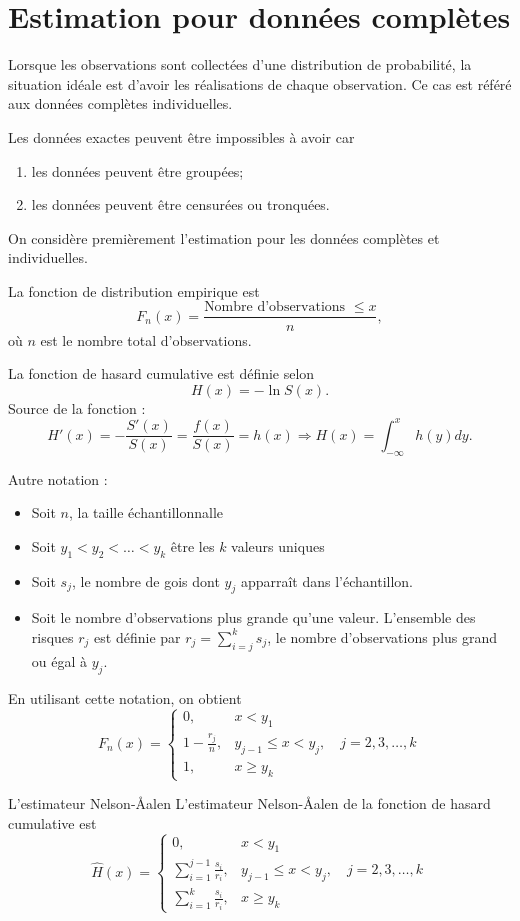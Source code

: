 \chapter{Estimation pour données complètes}

Lorsque les observations sont collectées d'une distribution de probabilité, la situation idéale est d'avoir les réalisations de chaque observation. Ce cas est référé aux données complètes individuelles. 

Les données exactes peuvent être impossibles à avoir car
\begin{enumerate}
	\item les données peuvent être groupées;
	\item les données peuvent être censurées ou tronquées. 
\end{enumerate}

On considère premièrement l'estimation pour les données complètes et individuelles. 

\begin{definition}{}{}
	La fonction de distribution empirique est 
	$$F_n(x) = \frac{\text{Nombre d'observations }\leq x}{n},$$
	où $n$ est le nombre total d'observations. 
\end{definition}

\begin{definition}{}{}
	La fonction de hasard cumulative est définie selon 
	$$H(x) = -\ln S(x).$$
	\tcblower
	Source de la fonction : 
	$$H'(x) = -\frac{S'(x)}{S(x)} = \frac{f(x)}{S(x)} = h(x) \Rightarrow H(x) = \int_{-\infty}^{x} h(y) dy.$$
\end{definition}

Autre notation : 

\begin{itemize}
	\item Soit $n$, la taille échantillonnalle
	\item Soit $y_1<y_2<\dots<y_k$ être les $k$ valeurs uniques
	\item Soit $s_j$, le nombre de gois dont $y_j$ apparraît dans l'échantillon. 
	\item Soit le nombre d'observations plus grande qu'une valeur. L'ensemble des risques $r_j$ est définie par $r_j = \sum_{i = j}^{k}s_j$, le nombre d'observations plus grand ou égal à $y_j$.
\end{itemize}
En utilisant cette notation, on obtient
$$F_n(x) = \begin{cases}
0,&x<y_1\\
1-\frac{r_j}{n}, & y_{j-1}\leq x < y_j,\quad j = 2, 3, \dots, k\\
1,& x\geq y_k
\end{cases}$$

\begin{definition}{L'estimateur Nelson-\AA{}alen}{}
	L'estimateur Nelson-\AA{}alen de la fonction de hasard cumulative est 
	$$\hat{H}(x) = \begin{cases}
	0,&x<y_1\\
	\sum_{i = 1}^{j-1} \frac{s_i}{r_i}, & y_{j-1}\leq x < y_j,\quad j = 2, 3, \dots, k\\
	\sum_{i = 1}^{k} \frac{s_i}{r_i},& x\geq y_k
	\end{cases}$$
\end{definition}